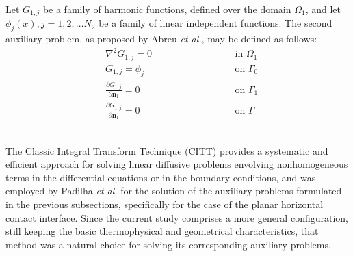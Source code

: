 \documentclass[conference,compsoc,fleqn]{IEEEtran}
\begin{document}

Let $G_{1,j}$ be a family of harmonic functions, defined over the domain $\Omega_1$, and let $\phi_j(x), j=1,2,\ldots N_2$ be a family of linear independent functions. The second auxiliary problem, as proposed by Abreu \textit{et al.}\cite{artigo_abreu_3}, may be defined as follows:
\begin{subequations}
	\begin{alignat}{2}
		& \nabla^2 G_{1,j} = 0 \quad\quad\quad\quad\quad && \text{ in } \Omega_1 \label{funcao_G_harm_T1} \\ 
		& G_{1,j} = \phi_j && \text{ on } \Gamma_0  \label{funcao_G_cc_T1_2} \\
		& \frac{\partial G_{1,j}}{\partial \mathbf{n}_1} = 0 && \text{ on }  \Gamma_1 \label{funcao_G_cc_T1_1} \\ 
		& \frac{\partial G_{1,j}}{\partial\mathbf{n}_1} = 0 \quad\quad\quad\quad\quad\quad\quad\quad && \text{ on }  \Gamma \label{funcao_G_cc_grad_T1}
	\end{alignat}
\end{subequations}
\\


The Classic Integral Transform Technique (CITT) provides a systematic and efficient approach for solving linear diffusive problems envolving nonhomogeneous terms in the differential equations or in the boundary conditions\cite{livro_integral_transforms_cotta}, and was employed by Padilha \textit{et al.}\cite{artigo_padilha_3} for the solution of the auxiliary problems formulated in the previous subsections, specifically for the case of the planar horizontal contact interface. Since the current study comprises a more general configuration, still keeping the basic thermophysical and geometrical characteristics, that method was a natural choice for solving its corresponding auxiliary problems.
\end{document}
